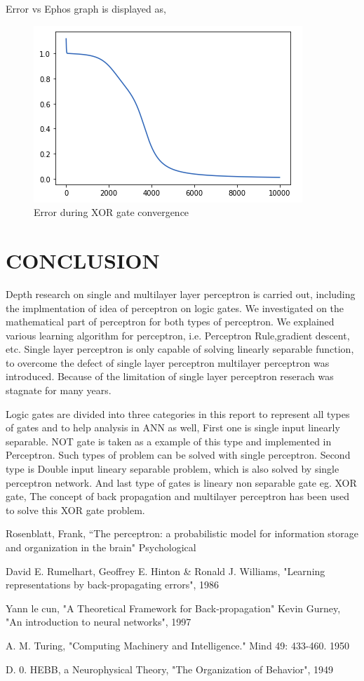 \documentclass[a4paper,12pt]{report}
\begin{document}
Error vs Ephos graph is displayed as,
\begin{figure}[htp]
	\centering
	\includegraphics[scale=0.80]{resources/image-11.png}
	\caption{Error during XOR gate convergence}
	\label{}
\end{figure}



\chapter{CONCLUSION}
Depth research on single and multilayer layer perceptron is carried out, including the implmentation of idea of perceptron on logic gates. We investigated on the mathematical part of perceptron for both types of perceptron.
We explained various learning algorithm for perceptron, i.e. Perceptron Rule,gradient descent, etc. Single layer perceptron is only capable of solving linearly separable function, to overcome the defect of single layer perceptron
multilayer perceptron was introduced. Because of the limitation of single
layer perceptron reserach was stagnate for many years. 

Logic gates are divided into three categories in this report to represent all types of gates and to help analysis in ANN as well, First one is single input linearly separable. NOT gate is taken as a example of this type and implemented in Perceptron. Such types of problem can be solved with single perceptron. Second type is Double input lineary separable problem, which is also solved by single perceptron network. And last type of gates is lineary non separable gate eg. XOR gate, The concept of back propagation and multilayer perceptron has been used to solve this XOR gate problem.  


\begin{thebibliography}{}
Rosenblatt, Frank, “The perceptron: a probabilistic model for information storage and organization in the brain" Psychological

David E. Rumelhart, Geoffrey E. Hinton \& Ronald J. Williams, "Learning representations by back-propagating errors", 1986

Yann le cun, "A Theoretical Framework for Back-propagation"
Kevin Gurney, "An introduction to neural networks", 1997

A. M. Turing, "Computing Machinery and Intelligence." Mind 49: 433-460. 1950

D. 0. HEBB, a Neurophysical Theory, "The Organization of Behavior", 1949
\end{thebibliography}
\end{document}
